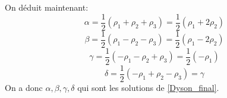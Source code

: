 \documentclass[12pt]{article}
\begin{document}
On d\'eduit maintenant:
\begin{equation}
 \alpha = \frac{1}{2}(\rho_1 + \rho_2 + \rho_3) = \frac{1}{2}(\rho_1 + 2\rho_2)
\end{equation}
\begin{equation}
  \beta = \frac{1}{2}(\rho_1 - \rho_2 - \rho_3) = \frac{1}{2}(\rho_1 - 2\rho_2)
\end{equation}
\begin{equation}
 \gamma = \frac{1}{2}(-\rho_1 - \rho_2 + \rho_3) = \frac{1}{2}(-\rho_1)
\end{equation}
\begin{equation}
  \delta = \frac{1}{2}(-\rho_1 + \rho_2 - \rho_3) = \gamma
\end{equation}
On a donc $\alpha , \beta, \gamma,\delta$ qui sont les solutions de \ref{Dyson_final}.
\end{document}
